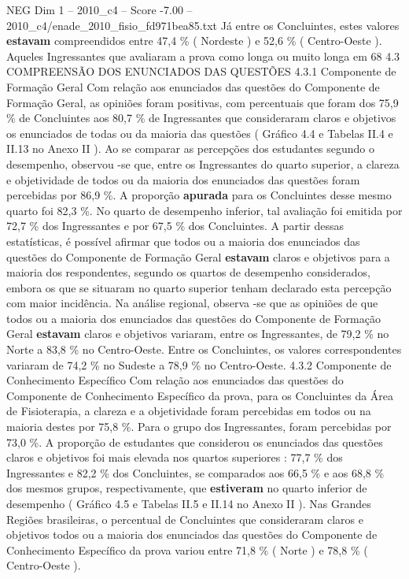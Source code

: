 \begin{textsample}{NEG Dim 1 – 2010\_c4 – Score -7.00 – 2010\_c4/enade\_2010\_fisio\_fd971bea85.txt}
Já entre os Concluintes, estes valores \textbf{estavam} compreendidos entre 47,4 \% ( Nordeste ) e 52,6 \% ( Centro-Oeste ).
Aqueles Ingressantes que avaliaram a prova como longa ou muito longa em 68 4.3 COMPREENSÃO DOS ENUNCIADOS DAS QUESTÕES 4.3.1 Componente de Formação Geral Com relação aos enunciados das questões do Componente de Formação Geral, as opiniões foram positivas, com percentuais que foram dos 75,9 \% de Concluintes aos 80,7 \% de Ingressantes que consideraram claros e objetivos os enunciados de todas ou da maioria das questões ( Gráfico 4.4 e Tabelas II.4 e II.13 no Anexo II ).
Ao se comparar as percepções dos estudantes segundo o desempenho, observou -se que, entre os Ingressantes do quarto superior, a clareza e objetividade de todos ou da maioria dos enunciados das questões foram percebidas por 86,9 \%.
A proporção \textbf{apurada} para os Concluintes desse mesmo quarto foi 82,3 \%.
No quarto de desempenho inferior, tal avaliação foi emitida por 72,7 \% dos Ingressantes e por 67,5 \% dos Concluintes.
A partir dessas estatísticas, é possível afirmar que todos ou a maioria dos enunciados das questões do Componente de Formação Geral \textbf{estavam} claros e objetivos para a maioria dos respondentes, segundo os quartos de desempenho considerados, embora os que se situaram no quarto superior tenham declarado esta percepção com maior incidência.
Na análise regional, observa -se que as opiniões de que todos ou a maioria dos enunciados das questões do Componente de Formação Geral \textbf{estavam} claros e objetivos variaram, entre os Ingressantes, de 79,2 \% no Norte a 83,8 \% no Centro-Oeste.
Entre os Concluintes, os valores correspondentes variaram de 74,2 \% no Sudeste a 78,9 \% no Centro-Oeste. 4.3.2 Componente de Conhecimento Específico Com relação aos enunciados das questões do Componente de Conhecimento Específico da prova, para os Concluintes da Área de Fisioterapia, a clareza e a objetividade foram percebidas em todos ou na maioria destes por 75,8 \%.
Para o grupo dos Ingressantes, foram percebidas por 73,0 \%.
A proporção de estudantes que considerou os enunciados das questões claros e objetivos foi mais elevada nos quartos superiores : 77,7 \% dos Ingressantes e 82,2 \% dos Concluintes, se comparados aos 66,5 \% e aos 68,8 \% dos mesmos grupos, respectivamente, que \textbf{estiveram} no quarto inferior de desempenho ( Gráfico 4.5 e Tabelas II.5 e II.14 no Anexo II ).
Nas Grandes Regiões brasileiras, o percentual de Concluintes que consideraram claros e objetivos todos ou a maioria dos enunciados das questões do Componente de Conhecimento Específico da prova variou entre 71,8 \% ( Norte ) e 78,8 \% ( Centro-Oeste ).

\end{textsample}
